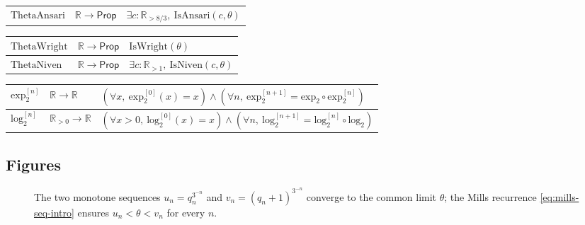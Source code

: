 \documentclass[11pt,reqno]{amsart}
\theoremstyle{blueplain}
\numberwithin{equation}{section}
\begin{document}
{\begin{tabular}{|m{4cm}|m{5cm}|m{9cm}|}
		$\mathrm{ThetaAnsari}$ & $\mathbb{R}\to\mathsf{Prop}$ &
		$\exists c:\mathbb{R}_{>8/3},\ \mathrm{IsAnsari}(c,\theta)$ \\ 
	\end{tabular}
	\noindent \newline
	\noindent
	\begin{tabular}{|m{4cm}|m{5cm}|m{9cm}|}
		\hline
		$\mathrm{ThetaWright}$ & $\mathbb{R}\to\mathsf{Prop}$ &
		$\mathrm{IsWright}(\theta)$ \\ \hline
		$\mathrm{ThetaNiven}$ & $\mathbb{R}\to\mathsf{Prop}$ &
		$\exists c:\mathbb{R}_{>1},\ \mathrm{IsNiven}(c,\theta)$ \\ 
	\end{tabular}%
	\noindent \newline
	\noindent
	\begin{tabular}{|m{4cm}|m{5cm}|m{9cm}|}
		\hline
		$\mathrm{exp}_2^{[n]}$ & $\mathbb{R}\to\mathbb{R}$ &
		$(\forall x,\ \mathrm{exp}_2^{[0]}(x)=x)\wedge(\forall n,\
		\mathrm{exp}_2^{[n+1]}=\mathrm{exp}_2\circ\mathrm{exp}_2^{[n]})$ \\ \hline
		$\mathrm{log}_2^{[n]}$ & $\mathbb{R}_{>0}\to\mathbb{R}$ &
		$(\forall x>0,\ \mathrm{log}_2^{[0]}(x)=x)\wedge(\forall n,\
		\mathrm{log}_2^{[n+1]}=\mathrm{log}_2^{[n]}\circ\mathrm{log}_2)$ \\ \hline
	\end{tabular}
}
\newpage
\subsection{Figures}\label{sec:appendix-figures}
\noindent \vspace{-0.3in}
\begin{figure}[H]
	\centering
	\caption{The two monotone sequences $u_n=q_n^{3^{-n}}$ and $v_n=(q_n+1)^{3^{-n}}$ converge to the common limit $\theta$; the Mills recurrence \cref{eq:mills-seq-intro} ensures $u_n<\theta<v_n$ for every $n$.}
	\label{fig:mills-recurrence3}
\end{figure}
\end{document}
